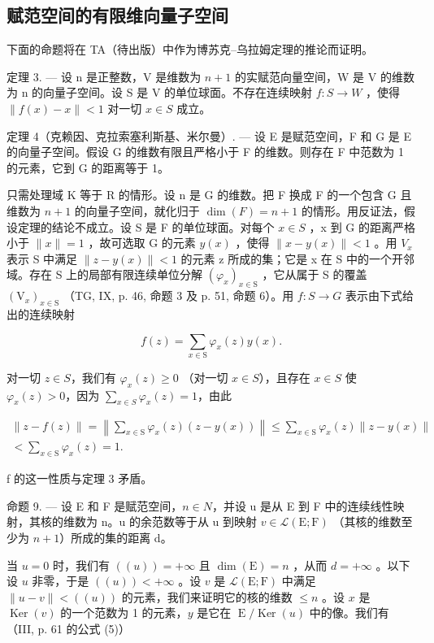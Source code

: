 \subsection{赋范空间的有限维向量子空间}

下面的命题将在 TA（待出版）中作为博苏克–乌拉姆定理的推论而证明。

定理 3. — 设 n 是正整数，V 是维数为 \(n + 1\) 的实赋范向量空间，W 是 V 的维数为 n 的向量子空间。设 S 是 V 的单位球面。不存在连续映射 \(f: S \to W\) ，使得 \(\|f(x) - x\| < 1\) 对一切 \(x \in S\) 成立。

定理 4（克赖因、克拉索塞利斯基、米尔曼）. — 设 E 是赋范空间，F 和 G 是 E 的向量子空间。假设 G 的维数有限且严格小于 F 的维数。则存在 F 中范数为 1 的元素，它到 G 的距离等于 1。

只需处理域 K 等于 R 的情形。设 n 是 G 的维数。把 F 换成 F 的一个包含 G 且维数为 \(n+1\) 的向量子空间，就化归于 \(\dim(F)=n+1\) 的情形。用反证法，假设定理的结论不成立。设 S 是 F 的单位球面。对每个 \(x\in S\) ，x 到 G 的距离严格小于 \(\|x\|=1\) ，故可选取 G 的元素 \(y(x)\) ，使得 \(\|x-y(x)\|<1\) 。用 \(V_{x}\) 表示 S 中满足 \(\|z-y(x)\|<1\) 的元素 z 所成的集；它是 x 在 S 中的一个开邻域。存在 S 上的局部有限连续单位分解 \((\varphi_{x})_{x\in\mathrm{S}}\) ，它从属于 S 的覆盖 \((\mathrm{V}_{x})_{x\in\mathrm{S}}\) （TG, IX, p. 46, 命题 3 及 p. 51, 命题 6）。用 \(f\colon S\to G\) 表示由下式给出的连续映射

\[
f (z) = \sum_ {x \in \mathrm{S}} \varphi_ {x} (z) y (x).
\]

对一切 \(z \in S\)，我们有 \(\varphi_x(z) \geqslant 0\) （对一切 \(x \in S\)），且存在 \(x \in S\) 使 \(\varphi_x(z) > 0\)，因为 \(\sum_{x \in S} \varphi_x(z) = 1\)，由此

\[
\begin{array}{c} \| z - f (z) \| = \left\| \sum_ {x \in \mathrm{S}} \varphi_ {x} (z) (z - y (x)) \right\| \leqslant \sum_ {x \in \mathrm{S}} \varphi_ {x} (z) \| z - y (x) \| \\ <   \sum_ {x \in \mathrm{S}} \varphi_ {x} (z) = 1. \end{array}
\]

f 的这一性质与定理 3 矛盾。

命题 9. — 设 E 和 F 是赋范空间，\(n \in N\)，并设 u 是从 E 到 F 中的连续线性映射，其核的维数为 n。u 的余范数等于从 u 到映射 \(v \in \mathcal{L}(\mathrm{E};\mathrm{F})\) （其核的维数至少为 \(n + 1\)）所成的集的距离 d。

当 \(u = 0\) 时，我们有 \(((u)) = +\infty\) 且 \(\dim(\mathrm{E}) = n\) ，从而 \(d = +\infty\) 。以下设 \(u\) 非零，于是 \(((u)) < +\infty\) 。设 \(v\) 是 \(\mathcal{L}(\mathrm{E};\mathrm{F})\) 中满足 \(\| u - v \| < ((u))\) 的元素，我们来证明它的核的维数 \(\leqslant n\) 。设 \(x\) 是 \(\operatorname{Ker}(v)\) 的一个范数为 1 的元素，\(y\) 是它在 \(\operatorname{E}/\operatorname{Ker}(u)\) 中的像。我们有（III, p. 61 的公式 (5)）

